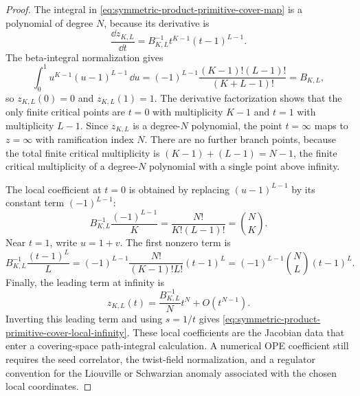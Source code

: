 \begin{proof}
The integral in \eqref{eq:symmetric-product-primitive-cover-map} is a
polynomial of degree \(N\), because its derivative is
\[
  \frac{\dd z_{K,L}}{\dd t}
  =
  B_{K,L}^{-1}t^{K-1}(t-1)^{L-1}.
\]
The beta-integral normalization gives
\[
  \int_0^1 u^{K-1}(u-1)^{L-1}\,\dd u
  =
  (-1)^{L-1}\frac{(K-1)!(L-1)!}{(K+L-1)!}
  =
  B_{K,L},
\]
so \(z_{K,L}(0)=0\) and \(z_{K,L}(1)=1\).  The derivative factorization shows
that the only finite critical points are \(t=0\) with multiplicity \(K-1\)
and \(t=1\) with multiplicity \(L-1\).  Since \(z_{K,L}\) is a degree-\(N\)
polynomial, the point \(t=\infty\) maps to \(z=\infty\) with ramification
index \(N\).
There are no further branch points, because the total finite critical
multiplicity is \((K-1)+(L-1)=N-1\), the finite critical multiplicity of a
degree-\(N\) polynomial with a single point above infinity.

The local coefficient at \(t=0\) is obtained by replacing
\((u-1)^{L-1}\) by its constant term \((-1)^{L-1}\):
\[
  B_{K,L}^{-1}\frac{(-1)^{L-1}}K
  =
  \frac{N!}{K!(L-1)!}
  =
  \binom{N}{K}.
\]
Near \(t=1\), write \(u=1+v\).  The first nonzero term is
\[
  B_{K,L}^{-1}\frac{(t-1)^L}{L}
  =
  (-1)^{L-1}\frac{N!}{(K-1)!L!}(t-1)^L
  =
  (-1)^{L-1}\binom{N}{L}(t-1)^L.
\]
Finally, the leading term at infinity is
\[
  z_{K,L}(t)
  =
  \frac{B_{K,L}^{-1}}N t^N+O(t^{N-1}).
\]
Inverting this leading term and using \(s=1/t\) gives
\eqref{eq:symmetric-product-primitive-cover-local-infinity}.  These local
coefficients are the Jacobian data that enter a covering-space path-integral
calculation.  A numerical OPE coefficient still requires the seed correlator,
the twist-field normalization, and a regulator convention for the Liouville
or Schwarzian anomaly associated with the chosen local coordinates.
\end{proof}

